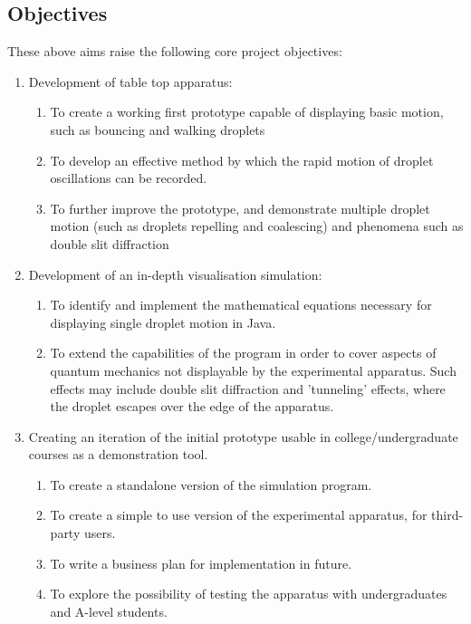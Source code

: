 \subsection{Objectives}
These above aims raise the following core project objectives: 
\begin{enumerate}
   \item Development of table top apparatus: 
   \begin{enumerate}
     \item To create a working first prototype capable of displaying basic  motion, such as bouncing and walking droplets
     \item To develop an effective method by which the rapid motion of droplet oscillations can be recorded.
     \item To further improve the prototype, and demonstrate multiple droplet motion (such as droplets repelling and coalescing) and phenomena such as double slit diffraction
    \end{enumerate}
   \item Development of an in-depth visualisation simulation:
   \begin{enumerate}
     \item To identify and implement the mathematical equations necessary for displaying single droplet motion in Java. 
     \item To extend the capabilities of the program in order to cover aspects of quantum mechanics not displayable by the experimental apparatus. Such effects may include double slit diffraction and 'tunneling' effects, where the droplet escapes over the edge of the apparatus. 
    \end{enumerate}
    \item Creating an iteration of the initial prototype usable in college/undergraduate courses as a demonstration tool.  
   \begin{enumerate}
     \item To create a standalone version of the simulation program.
     \item To create a simple to use version of the experimental apparatus, for third-party users. 
     \item To write a business plan for implementation in future.
     \item To explore the possibility of testing the apparatus with undergraduates and A-level students. 
    \end{enumerate}
\end{enumerate}
